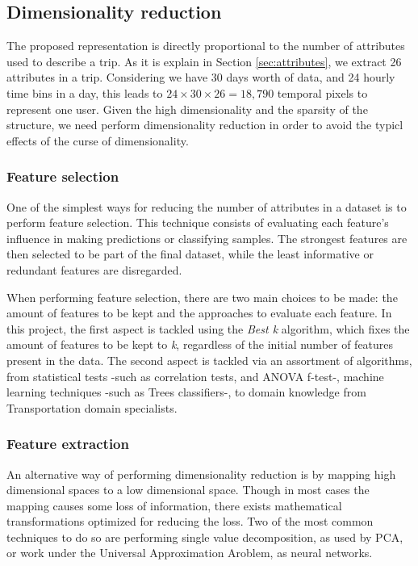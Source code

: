 \documentclass{article}
\begin{document}
\subsection{Dimensionality reduction}
The proposed representation is directly proportional to the number of attributes used to describe a trip. As it is explain in Section \ref{sec:attributes}, we extract 26 attributes in a trip. Considering we have 30 days worth of data, and 24 hourly time bins in a day, this leads to $24 \times 30 \times 26 = 18,790$ temporal pixels to represent one user. Given the high dimensionality and the sparsity of the structure, we need perform dimensionality reduction in order to avoid the typicl effects of the curse of dimensionality. 

\subsubsection{Feature selection}
One of the simplest ways for reducing the number of attributes in a dataset is to perform feature selection. This technique consists of evaluating each feature's influence in making predictions or classifying samples. The strongest features are then selected to be part of the final dataset, while the least informative or redundant features are disregarded. 

When performing feature selection, there are two main choices to be made: the amount of features to be kept and the approaches to evaluate each feature. In this project, the first aspect is tackled using the \textit{Best k} algorithm, which fixes the amount of features to be kept to \textit{k}, regardless of the initial number of features present in the data. The second aspect is tackled via an assortment of algorithms, from statistical tests -such as correlation tests, and ANOVA f-test-, machine learning techniques -such as Trees classifiers-, to domain knowledge from Transportation domain specialists. 

\subsubsection{Feature extraction}
An alternative way of performing dimensionality reduction is by mapping high dimensional spaces to a low dimensional space. Though in most cases the mapping causes some loss of information, there exists mathematical transformations optimized for reducing the loss. Two of the most common techniques to do so are performing single value decomposition, as used by PCA, or work under the Universal Approximation Aroblem, as neural networks. 
\end{document}
